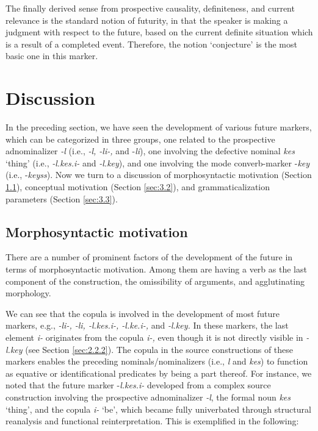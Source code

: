 \documentclass[output=paper,colorlinks,citecolor=brown]{langscibook}
\begin{document}
The finally derived sense from prospective causality, definiteness, and current relevance is the standard notion of futurity, in that the speaker is making a judgment with respect to the future, based on the current definite situation which is a result of a completed event. Therefore, the notion `conjecture' is the most basic one in this marker. 


\section{Discussion} \label{sec:3}
In the preceding section, we have seen the development of various future markers, which can be categorized in three groups, one related to the prospective adnominalizer \textit{-l} (i.e., \textit{-l, -li-, }and -\textit{li}), one involving the defective nominal \textit{kes} ‘thing’ (i.e., \textit{-l.kes.i-} and \textit{-l.key}), and one involving the mode converb-marker -\textit{key} (i.e., -\textit{keyss}). Now we turn to a discussion of morphosyntactic motivation (Section \ref{sec:3.1}), conceptual motivation (Section \ref{sec:3.2}), and grammaticalization parameters (Section \ref{sec:3.3}).


\subsection{Morphosyntactic motivation} \label{sec:3.1}
There are a number of prominent factors of the development of the future in terms of morphosyntactic motivation. Among them are having a verb as the last component of the construction, the omissibility of arguments, and agglutinating morphology. 

We can see that the copula is involved in the development of most future markers, e.g., \textit{-li-, -li, -l.kes.i-, -l.ke.i-, }and \textit{-l.key.} In these markers, the last element \textit{i-} originates from the copula \textit{i-,} even though it is not directly visible in \textit{-l.key} (see Section \ref{sec:2.2.2}). The copula in the source constructions of these markers enables the preceding nominals/nominalizers (i.e., \textit{l} and \textit{kes}) to function as equative or identificational predicates by being a part thereof. For instance, we noted that the future marker -\textit{l.kes.i-} developed from a complex source construction involving the prospective adnominalizer \textit{-l}, the formal noun \textit{kes} ‘thing’, and the copula \textit{i- }‘be’, which became fully univerbated through structural reanalysis and functional reinterpretation. This is exemplified in the following:
\end{document}
